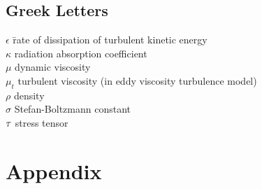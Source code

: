 \documentclass[graybox]{svmult}
\begin{document}
\subsection{Greek Letters}

\begin{tabbing}
$\epsilon$ \hspace{1in}  \= rate of dissipation of turbulent kinetic energy \\
$\kappa$                 \> radiation absorption coefficient \\
$\mu$                    \> dynamic viscosity \\
$\mu_t$                  \> turbulent viscosity (in eddy viscosity turbulence model) \\
$\rho$                   \> density \\
$\sigma$                 \> Stefan-Boltzmann constant \\
$\tens{\tau}$	         \> stress tensor
\end{tabbing}





\section*{Appendix}
\end{document}
